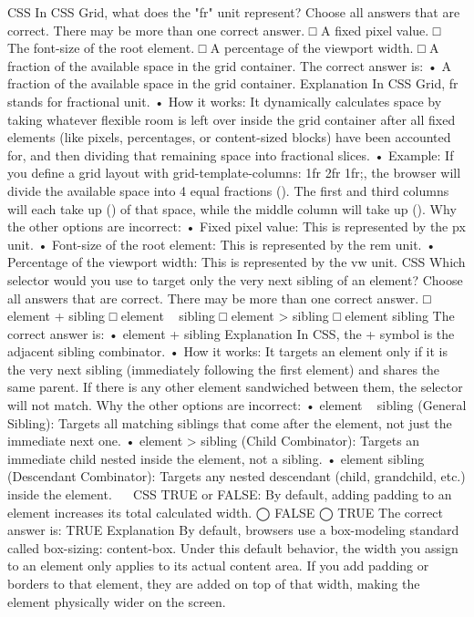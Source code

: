 CSS
In CSS Grid, what does the "fr" unit represent?
Choose all answers that are correct. There may be more than one correct answer.
□ A fixed pixel value.
□ The font-size of the root element.
□ A percentage of the viewport width.
□ A fraction of the available space in the grid container.
The correct answer is:
•	A fraction of the available space in the grid container.
Explanation
In CSS Grid, fr stands for fractional unit.
•	How it works: It dynamically calculates space by taking whatever flexible room is left over inside the grid container after all fixed elements (like pixels, percentages, or content-sized blocks) have been accounted for, and then dividing that remaining space into fractional slices.
•	Example: If you define a grid layout with grid-template-columns: 1fr 2fr 1fr;, the browser will divide the available space into 4 equal fractions (). The first and third columns will each take up () of that space, while the middle column will take up ().
Why the other options are incorrect:
•	Fixed pixel value: This is represented by the px unit.
•	Font-size of the root element: This is represented by the rem unit.
•	Percentage of the viewport width: This is represented by the vw unit.
CSS
Which selector would you use to target only the very next sibling of an element?
Choose all answers that are correct. There may be more than one correct answer.
□ element + sibling
□ element ~ sibling
□ element > sibling
□ element sibling
The correct answer is:
•	element + sibling
Explanation
In CSS, the + symbol is the adjacent sibling combinator.
•	How it works: It targets an element only if it is the very next sibling (immediately following the first element) and shares the same parent. If there is any other element sandwiched between them, the selector will not match.
Why the other options are incorrect:
•	element ~ sibling (General Sibling): Targets all matching siblings that come after the element, not just the immediate next one.
•	element > sibling (Child Combinator): Targets an immediate child nested inside the element, not a sibling.
•	element sibling (Descendant Combinator): Targets any nested descendant (child, grandchild, etc.) inside the element.
 
CSS
TRUE or FALSE: By default, adding padding to an element increases its total calculated width.
◯ FALSE
◯ TRUE
The correct answer is:
TRUE
Explanation
By default, browsers use a box-modeling standard called box-sizing: content-box. Under this default behavior, the width you assign to an element only applies to its actual content area.
If you add padding or borders to that element, they are added on top of that width, making the element physically wider on the screen.
